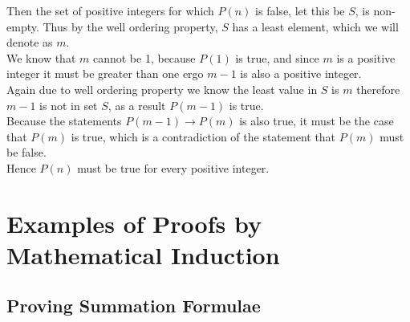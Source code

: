 \documentclass[12pt letter]{report}
\begin{document}
Then the set of positive integers for which $P \left( n \right) $ is false, let this be $S$, is non-empty. Thus by the
well ordering property, $S$ has a least element, which we will denote as $m$. \\

We know that $m$ cannot be 1, because $P \left( 1 \right) $ is true, and since $m$ is a positive integer it must be
greater than one ergo $m - 1$ is also a positive integer. \\

Again due to well ordering property we know the least value in $S$ is $m$ therefore $m - 1$ is not in set $S$, as a
result $P \left( m - 1 \right) $ is true. \\

Because the statements $P \left( m - 1 \right) \to P \left( m \right)  $ is also true, it must be the case that $P
  \left( m \right) $ is true, which is a contradiction of the statement that $P \left( m \right) $ must be false. \\

Hence $P \left( n \right) $ must be true for every positive integer.

\section{Examples of Proofs by Mathematical Induction}

\subsection{Proving Summation Formulae}


\end{document}

